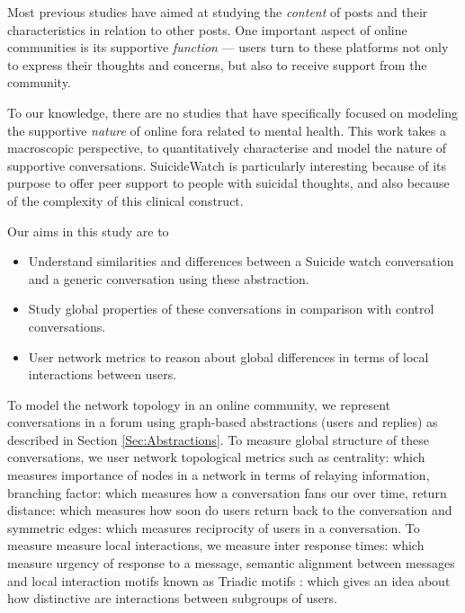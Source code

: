 Most previous studies have aimed at studying the \emph{content} of posts and their characteristics in relation to other posts. One important aspect of online communities is its supportive \emph{function} --- users turn to these platforms not only to express their thoughts and concerns, but also to receive support from the community. 

To our knowledge, there are no studies that have specifically focused on modeling the supportive \emph{nature} of online fora related to mental health. This work takes a macroscopic perspective, to quantitatively characterise and model the nature of supportive conversations. SuicideWatch is particularly interesting because of its purpose to offer peer support to people with suicidal thoughts, and also because of the complexity of this clinical construct.

Our aims in this study are to 
\begin{itemize} 
    \item Understand similarities and differences between a Suicide watch conversation and a generic conversation using these abstraction. 
    \item Study global properties of these conversations in comparison with control conversations. 
    \item User network metrics to reason about global differences in terms of local interactions between users. 
\end{itemize}
 
    
To model the network topology in an online community, we represent conversations in a forum using graph-based abstractions (users and replies) as described in Section \ref{Sec:Abstractions}. 
To measure global structure of these conversations, we user network topological metrics such as centrality: which measures importance of nodes in a network in terms of relaying information, branching factor: which measures how a conversation fans our over time, return distance: which measures how soon do users return back to the conversation and symmetric edges: which measures reciprocity of users in a conversation. To measure measure local interactions, we measure inter response times: which measure urgency of response to a message, semantic alignment between messages and local interaction motifs known as Triadic motifs : which gives an idea about how distinctive are interactions between subgroups of users. 

